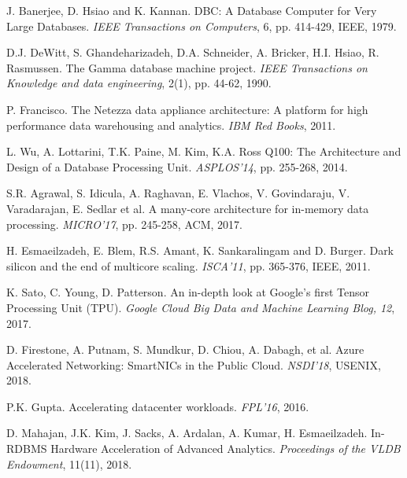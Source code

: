 \documentclass[11pt]{article}
\begin{document}
\begin{thebibliography}{10} 
\itemsep=1pt 

 J. Banerjee, D. Hsiao and K. Kannan. \newblock DBC: A Database Computer for Very Large Databases. \newblock \emph{IEEE Transactions on Computers}, 6, pp. 414-429, IEEE, 1979.

 D.J. DeWitt, S. Ghandeharizadeh, D.A. Schneider, A. Bricker, H.I. Hsiao, R. Rasmussen. \newblock The Gamma database machine project. \newblock \emph{IEEE Transactions on Knowledge and data engineering}, 2(1), pp. 44-62, 1990.

 P. Francisco. \newblock The Netezza data appliance architecture: A platform for high performance data warehousing and analytics. \newblock \emph{IBM Red Books}, 2011.

 L. Wu, A. Lottarini, T.K. Paine, M. Kim, K.A. Ross \newblock Q100: The Architecture and Design of a Database Processing Unit. \newblock \emph{ASPLOS'14}, pp. 255-268, 2014.

 S.R. Agrawal, S. Idicula, A. Raghavan, E. Vlachos, V. Govindaraju, V. Varadarajan, E. Sedlar et al. \newblock A many-core architecture for in-memory data processing. \newblock \emph{MICRO'17}, pp. 245-258, ACM, 2017.

 H. Esmaeilzadeh, E. Blem, R.S. Amant, K. Sankaralingam and D. Burger. \newblock Dark silicon and the end of multicore scaling. \newblock \emph{ISCA'11}, pp. 365-376, IEEE, 2011. 

 K. Sato, C. Young, D. Patterson. \newblock An in-depth look at Google’s first Tensor Processing Unit (TPU). \newblock \emph{Google Cloud Big Data and Machine Learning Blog, 12}, 2017.

 D. Firestone, A. Putnam, S. Mundkur, D. Chiou, A. Dabagh, et al. \newblock Azure Accelerated Networking: SmartNICs in the Public Cloud. \newblock \emph{NSDI'18}, USENIX, 2018.

 P.K. Gupta. \newblock Accelerating datacenter workloads. \newblock \emph{FPL'16}, 2016.

 D. Mahajan, J.K. Kim, J. Sacks, A. Ardalan, A. Kumar, H. Esmaeilzadeh. \newblock In-RDBMS Hardware Acceleration of Advanced Analytics. \newblock \emph{Proceedings of the VLDB Endowment}, 11(11), 2018.


\end{thebibliography}
\end{document}
